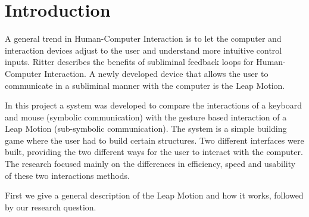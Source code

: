 \section{Introduction}
A general trend in Human-Computer Interaction is to let the computer and interaction devices adjust to the user and understand more intuitive control inputs. 
Ritter \cite{ritter2011benefits} describes the benefits of subliminal feedback loops for Human-Computer Interaction. 
A newly developed device that allows the user to communicate in a subliminal manner with the computer is the Leap Motion. 

In this project a system was developed to compare the interactions of a keyboard and mouse (symbolic communication) with the gesture based interaction of a Leap Motion 
(sub-symbolic communication). 
The system is a simple building game where the user had to build certain structures. Two different interfaces were built, providing the two different ways for the user to 
interact with the computer.
The research focused mainly on the differences in efficiency, speed and usability of these two interactions methods.

First we give a general description of the Leap Motion and how it works, followed by our research question.



